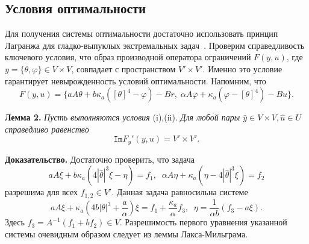 \subsection{Условия оптимальности}\label{subsec:ch2/sec2/subsec4}


Для получения системы оптимальности достаточно использовать
принцип Лагранжа для гладко-выпуклых экстремальных задач~\cite{10,11}.
Проверим справедливость ключевого условия, что образ производной
оператора ограничений $F(y, u)$, где $y=\{\theta,\varphi\}\in V\times V$,
совпадает с пространством $V'\times V'.$ Именно это условие гарантирует
невырожденность условий оптимальности.
Напомним, что
\[
    F(y, u) = \{ aA\theta + b \kappa_a ( [\theta]^4- \varphi) - Br,\;
    \alpha A \varphi + \kappa_a (\varphi -[\theta]^4) - Bu\}.
\]


\textbf{Лемма 2.}
\textit{Пусть выполняются условия} (i),(ii).
\textit{Для любой пары $\hat{y} \in V \times V, \hat{u} \in U$ справедливо равенство}
\[
    \texttt{Im}F_y'(y, u) = V' \times V'.
\]


\textbf{Доказательство.} Достаточно проверить, что задача
\[
    aA \xi + b \kappa_a (4|\hat{\theta}|^3 \xi - \eta) = f_1, \; \;
    \alpha A \eta + \kappa_a (\eta - 4|\hat{\theta}|^3 \xi) = f_2
\]
разрешима для всех $f_{1,2}\in V'.$ Данная задача равносильна системе
\[
    aA\xi + \kappa_a\left(4b|\theta|^3 + \frac{a}{\alpha}\right) \xi = f_1
    +\frac{\kappa_a}{\alpha}f_3, \; \;
    \eta =\frac{1}{\alpha b}( f_3-a\xi).
\]
Здесь $f_3=A^{-1}(f_1+bf_2)\in V.$ Разрешимость первого уравнения указанной
системы очевидным образом следует из леммы Лакса-Мильграма.


